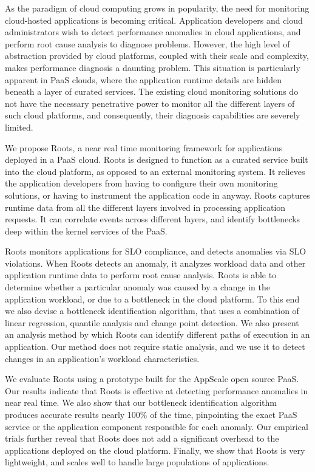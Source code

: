 As the paradigm of cloud computing grows in popularity, the need for monitoring cloud-hosted 
applications is becoming critical. Application developers and cloud administrators
wish to detect performance anomalies in cloud applications, and
perform root cause analysis to diagnose problems. However, the high level of abstraction provided by cloud
platforms, coupled with their scale and complexity, makes performance diagnosis
a daunting problem. This situation is particularly apparent in
PaaS clouds, where the application runtime details are hidden beneath a layer of curated services.
The existing cloud monitoring solutions do not have the necessary penetrative power
to monitor all the different layers of such cloud platforms, and consequently, their diagnosis
capabilities are severely limited.

We propose Roots, a near real time monitoring framework for applications deployed in a PaaS cloud. 
Roots is designed to function as a curated service
built into the cloud platform, as opposed to an external monitoring system. 
It relieves the application developers from having to configure
their own monitoring solutions, or having to instrument the application code in anyway.
Roots captures runtime data from all the different layers involved
in processing application requests. It can correlate events across different layers, and
identify bottlenecks deep within the kernel services of the PaaS.

Roots monitors applications for SLO compliance, and detects anomalies via SLO violations.
When Roots detects an anomaly, 
it analyzes workload data and other application runtime data
to perform root cause analysis. Roots is able to determine whether a particular
anomaly was caused by a change in the application workload, or due to a bottleneck
in the cloud platform. To this end we also devise a bottleneck identification algorithm, that
uses a combination of linear regression, quantile analysis and change point detection. 
We also present an analysis method by which Roots can identify different paths of execution
in an application. Our method does not require static analysis, and we use it to detect
changes in an application's workload characteristics.

We evaluate Roots using a prototype built for the AppScale open source PaaS. 
Our results indicate that Roots is effective at detecting performance anomalies
in near real time. We also show that our bottleneck identification algorithm
produces accurate results nearly 100\% of the time, pinpointing the exact PaaS
service or the application component responsible for each anomaly. Our empirical trials further 
reveal that Roots does not add a significant overhead to the applications deployed
on the cloud platform. Finally, we show that Roots is very lightweight, 
and scales well to handle large populations of applications.

